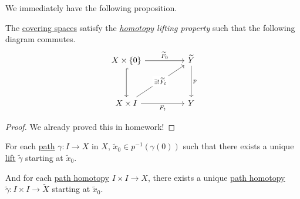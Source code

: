 We immediately have the following proposition.
\begin{proposition}\label{prop:homotopy-lifting-property}
	The \hyperref[def:covering-space]{covering spaces} satisfy the \emph{\hyperref[def:homotopy]{homotopy} lifting property} such that
	the following diagram commutes.
	\[
		\begin{tikzcd}
			{X\times \{0\}} && {\widetilde{Y} } \\
			\\
			{X\times I} && Y
			\arrow["{F_t}"', from=3-1, to=3-3]
			\arrow[hook, from=1-1, to=3-1]
			\arrow["{\widetilde{F}_0 }", from=1-1, to=1-3]
			\arrow["p", from=1-3, to=3-3]
			\arrow["{\exists ! \widetilde{F}_t }"{description}, from=3-1, to=1-3]
		\end{tikzcd}
	\]
\end{proposition}
\begin{proof}
	We already proved this in homework!
\end{proof}

\begin{corollary}
	For each \hyperref[def:path]{path} \(\gamma \colon I\to X\) in \(X\), \(\widetilde{x} _0\in p^{-1} (\gamma (0)) \) such that there exists a
	unique \hyperref[prop:homotopy-lifting-property]{lift} \(\widetilde{\gamma} \) starting at \(\widetilde{x} _0\).

	\par And for each \hyperref[def:homotopy-path]{path homotopy} \(I\times I\to X\), there exists a unique \hyperref[def:homotopy-path]{path homotopy}
	\(\widetilde{\gamma} \colon I\times I\to \widetilde{X} \) starting at \(\widetilde{x}_0\).
	\begin{figure}[H]
		\centering
		\label{fig:col:lec14:1}
	\end{figure}
\end{corollary}

